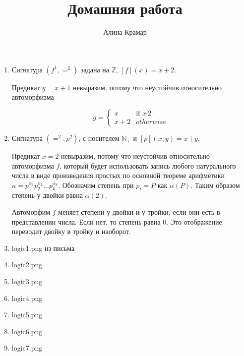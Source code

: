 \documentclass{article}
\begin{document}
\title{Домашняя работа}
\author{Алина Крамар}

\maketitle
\begin{enumerate}

\item

Сигнатура $(f^{1}, =^2)$ задана на $\mathbb{Z}$, $[f](x) = x + 2$.

Предикат $y = x + 1$ невыразим, потому что неустойчив относительно
автоморфизма

$$
g =
\left\{
  \begin{array}{ll}
    x     & \mbox{if } x  \vdots 2  \\
    x + 2 & otherwise
  \end{array}
\right.
$$

\item

Сигнатура $(=^2, p^2)$, с носителем $\mathbb{N}_+$ и $[p](x, y) = x$
$|$ $y$.

Предикат $x = 2$ невыразим, потому что неустойчив относительно
автоморфизма $f$, который будет использовать запись любого
натурального числа в виде произведения простых по основной теореме
арифметики
$n=p_1^{\alpha_{1}}p_2^{\alpha_2}...p_k^{\alpha_k}$. Обозначим степень
при $p_i = P$ как $\alpha(P)$. Таким образом степень у двойки равна
$\alpha(2)$.

Автоморфим $f$ меняет степени у двойки и у тройки, если они есть в
представлении числа. Если нет, то степень равна 0.
Это отображение переводит двойку в тройку и наоборот.

\item logic1.png из письма
\item logic2.png
\item logic3.png
\item logic4.png
\item logic5.png
\item logic6.png
\item logic7.png
\end{enumerate}
\end{document}

